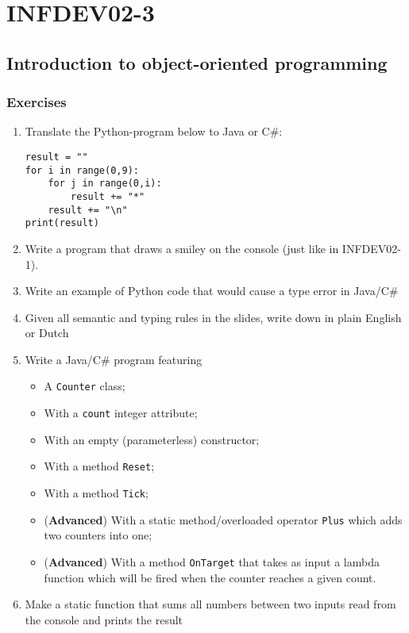 \setcounter{part}{3}
\part{INFDEV02-3}
\setcounter{chapter}{0}
\chapter{Introduction to object-oriented programming}

    \section{Exercises}
        \begin{enumerate}
            \item Translate the Python-program below to Java or C\#:
            \begin{lstlisting}
result = ""
for i in range(0,9):
    for j in range(0,i):
        result += "*"
    result += "\n"
print(result)
            \end{lstlisting}

            \item Write a program that draws a smiley on the console (just like in INFDEV02-1).
            \item Write an example of Python code that would cause a type error in Java/C\#
            \item Given all semantic and typing rules in the slides, write down in plain English or Dutch
            \item Write a Java/C\# program featuring
            \begin{itemize}
                \item A \texttt{Counter} class;
                \item With a \texttt{count} integer attribute;
                \item With an empty (parameterless) constructor;
                \item With a method \texttt{Reset};
                \item With a method \texttt{Tick};
                \item (\textbf{Advanced}) With a static method/overloaded operator \texttt{Plus} which adds two counters into one;
                \item (\textbf{Advanced}) With a method \texttt{OnTarget} that takes as input a lambda function which will be fired when the counter reaches a given count.
            \end{itemize}
            \item Make a static function that sums all numbers between two inputs read from the console and prints the result


\end{enumerate}
